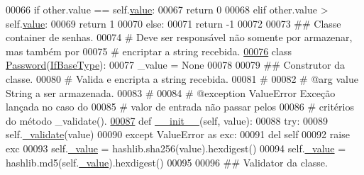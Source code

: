 \begin{DoxyCode}
00066         \textcolor{keywordflow}{if} other.value == self.\hyperlink{classELO_1_1BaseUnit_1_1IfBaseType_a2534c3548a8e5991dde0a64b4f0b542b}{value}:
00067             \textcolor{keywordflow}{return} 0
00068         \textcolor{keywordflow}{elif} other.value > self.\hyperlink{classELO_1_1BaseUnit_1_1IfBaseType_a2534c3548a8e5991dde0a64b4f0b542b}{value}:
00069             \textcolor{keywordflow}{return} 1
00070         \textcolor{keywordflow}{else}:
00071             \textcolor{keywordflow}{return} -1
00072 
00073 \textcolor{comment}{## Classe container de senhas.}
00074 \textcolor{comment}{#   Deve ser responsável não somente por armazenar, mas também por}
00075 \textcolor{comment}{#   encriptar a string recebida.}
\hypertarget{BaseUnit_8py_source_l00076}{}\hyperlink{classELO_1_1BaseUnit_1_1Password}{00076} \textcolor{keyword}{class }\hyperlink{classELO_1_1BaseUnit_1_1Password}{Password}(\hyperlink{classELO_1_1BaseUnit_1_1IfBaseType}{IfBaseType}):
00077     \_value = \textcolor{keywordtype}{None}
00078 
00079     \textcolor{comment}{## Construtor da classe.}
00080     \textcolor{comment}{#   Valida e encripta a string recebida.}
00081     \textcolor{comment}{#}
00082     \textcolor{comment}{#   @arg        value       String a ser armazenada.}
00083     \textcolor{comment}{#}
00084     \textcolor{comment}{#   @exception  ValueError  Exceção lançada no caso do}
00085     \textcolor{comment}{#                           valor de entrada não passar pelos}
00086     \textcolor{comment}{#                           critérios do método \_validate().}
\hypertarget{BaseUnit_8py_source_l00087}{}\hyperlink{classELO_1_1BaseUnit_1_1Password_a106b381037a9e99506db3f910eca1276}{00087}     \textcolor{keyword}{def }\hyperlink{classELO_1_1BaseUnit_1_1Password_a106b381037a9e99506db3f910eca1276}{\_\_init\_\_}(self, value):
00088         \textcolor{keywordflow}{try}:
00089             self.\hyperlink{classELO_1_1BaseUnit_1_1IfBaseType_acf84c5906a39b605a23ab68c4ca1dd19}{\_validate}(value)
00090         \textcolor{keywordflow}{except} ValueError \textcolor{keyword}{as} exc:
00091             del self
00092             \textcolor{keywordflow}{raise} exc
00093         self.\hyperlink{classELO_1_1BaseUnit_1_1IfBaseType_ad05d9d377fc4b99743c022cc8f6019d7}{\_value} = hashlib.sha256(value).hexdigest()
00094         self.\hyperlink{classELO_1_1BaseUnit_1_1IfBaseType_ad05d9d377fc4b99743c022cc8f6019d7}{\_value} = hashlib.md5(self.\hyperlink{classELO_1_1BaseUnit_1_1IfBaseType_ad05d9d377fc4b99743c022cc8f6019d7}{\_value}).hexdigest()
00095 
00096     \textcolor{comment}{## Validator da classe.}

\end{DoxyCode}
